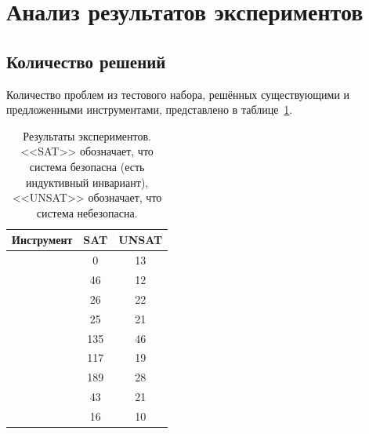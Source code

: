 \section{Анализ результатов экспериментов}



\subsection{Количество решений}

Количество проблем из тестового набора, решённых существующими и предложенными инструментами, представлено в таблице~\ref{table:eval-all}.

\begin{table}[t]
    \caption{Результаты экспериментов. <<SAT>> обозначает, что система безопасна (есть индуктивный инвариант), <<UNSAT>> обозначает, что система небезопасна.}
    \label{table:eval-all}
    \small
    \centering
    \begin{tabular}{ |l|c|c| }
    \hline
    Инструмент & SAT & UNSAT\\\hline
    \cvcind{} & 0 & 13\\
    \eldarica{} & 46 & 12\\
    \racer{} & 26 & 22\\
    \ringen{\cvc{}} & 25 & 21\\
    \ringen{\vampire{}} & 135 & 46\\
    \ringenCICI{\cvc{}} & 117 & 19\\
    \ringenCICI{\vampire{}} & 189 & 28\\
    \ringenSync{} & 43 & 21\\
    \vericat{} & 16 & 10\\
    \hline
    \end{tabular}
\end{table}


